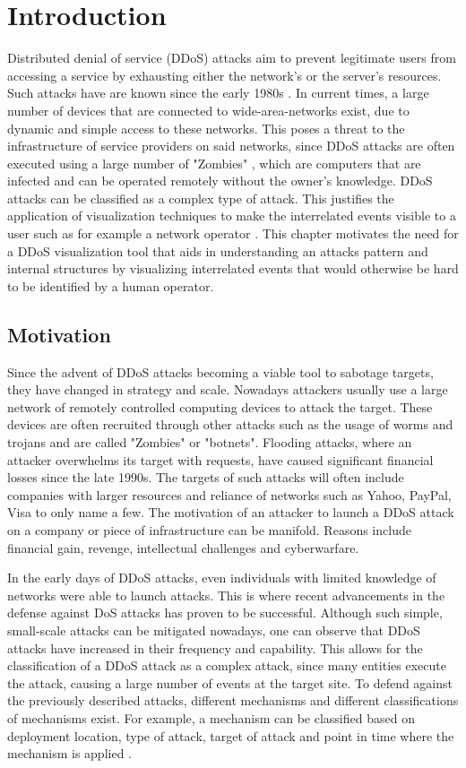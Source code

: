 \chapter{Introduction}
Distributed denial of service (DDoS) attacks aim to prevent legitimate users from accessing a service by exhausting either the network's or the server's resources. Such attacks have are known since the early 1980s \cite{zargar}. In current times, a large number of devices that are connected to wide-area-networks exist, due to dynamic and simple access to these networks. This poses a threat to the infrastructure of service providers on said networks, since DDoS attacks are often executed using a large number of "Zombies" \cite{zargar} \cite{kamboj}, which are computers that are infected and can be operated remotely without the owner's knowledge. DDoS attacks can be classified as a complex type of attack. This justifies the application of visualization techniques to make the interrelated events visible to a user such as for example a network operator \cite{yelizarov}.  This chapter motivates the need for a DDoS visualization tool that aids in understanding an attacks pattern and internal structures by visualizing interrelated events that would otherwise be hard to be identified by a human operator.

\section{Motivation}
Since the advent of DDoS attacks becoming a viable tool to sabotage targets, they have changed in strategy and scale. Nowadays attackers usually use a large network of remotely controlled computing devices to attack the target. These devices are often recruited through other attacks such as the usage of worms and trojans and are called "Zombies" or "botnets".
Flooding attacks, where an attacker overwhelms its target with requests, have caused significant financial losses since the late 1990s. The targets of such attacks will often include companies with larger resources and reliance of networks such as Yahoo, PayPal, Visa to only name a few. The motivation of an attacker to launch a DDoS attack on a company or piece of infrastructure can be manifold. Reasons include financial gain, revenge, intellectual challenges and cyberwarfare.

In the early days of DDoS attacks, even individuals with limited knowledge of networks were able to launch attacks. This is where recent advancements in the defense against DoS attacks has proven to be successful. Although such simple, small-scale attacks can be mitigated nowadays, one can observe that DDoS attacks have increased in their frequency and capability\cite{zargar}.
This allows for the classification of a DDoS attack as a complex attack, since many entities execute the attack, causing a large number of events at the target site\cite{yelizarov}.
To defend against the previously described attacks, different mechanisms and different classifications of mechanisms exist. For example, a mechanism can be classified based on deployment location, type of attack, target of attack and point in time where the mechanism is applied \cite{zargar}.


